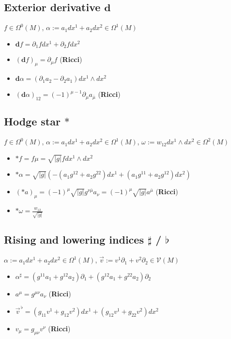 \documentclass{scrartcl}
\newcommand{\exd}{\mathbf{d}}
\newcommand{\vecflat}[1]{\vec{#1}^{\,\flat}}
\begin{document}
    \subsection{Exterior derivative \( \exd \)}
      \( f\in \Omega^{0}(M)\), 
      \( \alpha:= a_{1}dx^{1} + a_{2}dx^{2} \in \Omega^{1}(M) \)
      \begin{itemize}
        \item \( \exd f = \partial_{1}fdx^{1} + \partial_{2}fdx^{2} \)
        \item \( \left( \exd f \right)_{\mu} = \partial_{\mu}f \)  (\textbf{Ricci})
        \item \( \exd\alpha = \left( \partial_{1}a_{2} - \partial_{2}a_{1} \right) dx^{1}\wedge dx^{2}\)
        \item \( (\exd\alpha)_{12} = (-1)^{\mu-1}\partial_{\mu}a_{\bar{\mu}} \) (\textbf{Ricci})
      \end{itemize}

    \subsection{Hodge star \( * \)}
      \( f\in \Omega^{0}(M)\),
      \( \alpha:= a_{1}dx^{1} + a_{2}dx^{2} \in \Omega^{1}(M) \),
      \( \omega:= w_{12}dx^{1}\wedge dx^{2} \in \Omega^{2}(M) \)
      \begin{itemize}
        \item \( *f = f\mu = \sqrt{|g|}f dx^{1}\wedge dx^{2}\)
        \item \( *\alpha = \sqrt{|g|}\left( -\left( a_{1}g^{12} + a_{2}g^{22} \right)dx^{1} 
                                            +\left( a_{1}g^{11} + a_{2}g^{12} \right)dx^{2}\right) \)
        \item \( (*a)_{\mu} =  \left( -1 \right)^{\mu} \sqrt{|g|} g^{\nu\bar{\mu}}a_{\nu}
                          = \left( -1 \right)^{\mu} \sqrt{|g|} a^{\bar{\mu}}\)
                          (\textbf{Ricci})
        \item \( *\omega = \frac{w_{12}}{\sqrt{|g|}} \)
      \end{itemize}

    \subsection{Rising and lowering indices \( \sharp \) / \( \flat \)}
      \( \alpha:= a_{1}dx^{1} + a_{2}dx^{2} \in \Omega^{1}(M) \),
      \( \vec{v} := v^{1}\partial_{1} + v^{2}\partial_{2}\in\mathcal{V}(M) \)
      \begin{itemize}
        \item \( \alpha^{\sharp} = \left( g^{11}a_{1}+g^{12}a_{2} \right)\partial_{1} + \left( g^{12}a_{1}+g^{22}a_{2} \right)\partial_{2}\)
        \item \( a^{\mu} = g^{\mu\nu}a_{\nu}\) (\textbf{Ricci})
        \item \( \vecflat{v} = \left( g_{11}v^{1} + g_{12}v^{2} \right)dx^{1} + \left( g_{12}v^{1} + g_{22}v^{2} \right)dx^{2} \)
        \item \( v_{\mu} = g_{\mu\nu}v^{\nu} \) (\textbf{Ricci})
      \end{itemize}
\end{document}
